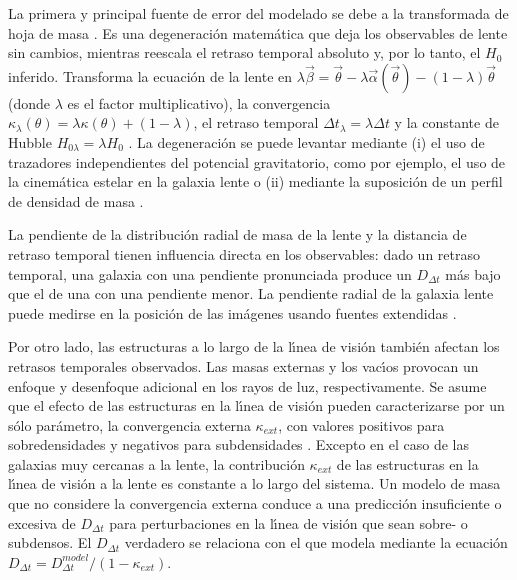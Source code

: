 \documentclass[baaa]{baaa}
\begin{document}
La primera y principal fuente de error del modelado  se debe a la transformada de hoja de masa \citep[{\em mass sheet transform}, MST,][]{falco1985}. Es una degeneraci\'on matem\'atica que deja los observables de lente sin cambios, mientras reescala el retraso temporal absoluto y, por lo tanto, el $H_0$ inferido. Transforma la ecuaci\'on de la lente en $\lambda \vec{\beta}=\vec{\theta} - \lambda \vec{\alpha}(\vec{\theta}) - (1-\lambda)\vec{\theta}$ (donde $\lambda$ es el factor multiplicativo), la convergencia $\kappa_{\lambda}(\theta)=\lambda \kappa(\theta)+(1-\lambda)$, el retraso temporal  $\Delta t_{\lambda}= \lambda \Delta t$ y la constante de Hubble  $H_{0 \lambda}=\lambda H_0$ \citep{birrer2020}. La degeneraci\'on se puede levantar mediante (i) el uso de trazadores independientes del potencial gravitatorio, como por ejemplo, el uso de la cinem\'atica estelar en la galaxia lente o (ii) mediante la suposici\'on de un perfil de densidad de masa \citep[por ejemplo, una ley de potencias para las estrellas y un perfil de][para el halo de materia oscura]{navarro1997}. 

La pendiente de la distribuci\'on radial de masa de la lente y la distancia de retraso temporal tienen influencia directa en los observables: dado un retraso temporal, una galaxia con una pendiente pronunciada produce un $D_{\Delta t}$ m\'as bajo que el de una con una pendiente menor. La pendiente radial de la galaxia lente puede medirse en la posici\'on de las im\'agenes usando fuentes extendidas \citep[e.g.  la galaxia anfitriona del cu\'asar con efecto lente,][]{suyu2012}.

Por otro lado, las estructuras a lo largo de la l\'{\i}nea de visi\'on tambi\'en afectan los retrasos temporales observados. Las masas externas y los vac\'{\i}os provocan un enfoque y desenfoque adicional en los rayos de luz, respectivamente. Se asume que el efecto de las estructuras en la l\'{\i}nea de visi\'on pueden caracterizarse por un s\'olo par\'ametro, la convergencia externa $\kappa_{ext}$, con valores positivos para sobredensidades y negativos para subdensidades \citep{keeton2003}. Excepto en el caso de las galaxias muy cercanas a la lente, la contribuci\'on $\kappa_{ext}$ de las estructuras en la l\'{\i}nea de visi\'on a la lente es constante a lo largo del sistema.
Un modelo de masa que no considere la convergencia externa conduce a una predicción insuficiente o excesiva de $D_{\Delta t}$ para perturbaciones en la l\'{\i}nea de visi\'on que sean sobre- o subdensos. El $D_{\Delta t}$ verdadero se relaciona con el que modela mediante la ecuaci\'on $D_{\Delta t}= D^{model}_{\Delta t}/(1- \kappa_{ext})$. 
\end{document}
